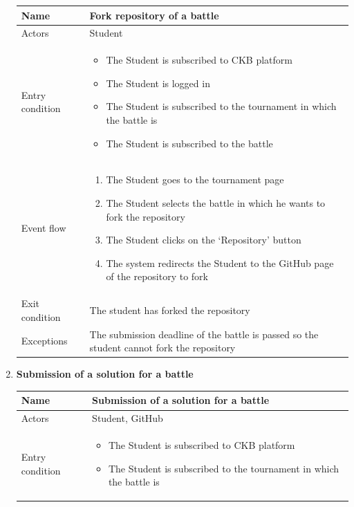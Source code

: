 \begin{enumerate}[label=UC\arabic*:]
    \begin{tabular}{|p{3cm}|p{8cm}|}
        \hline
        Name & Fork repository of a battle \\
        \hline
        Actors & Student \\
        \hline
        Entry condition &
        \begin{itemize}
            \item The Student is subscribed to CKB platform
            \item The Student is logged in
            \item The Student is subscribed to the tournament in which the battle is
            \item The Student is subscribed to the battle
        \end{itemize} \\
        \hline
        Event flow &
        \begin{enumerate}[label=\arabic*.]
            \item The Student goes to the tournament page
            \item The Student selects the battle in which he wants to fork the repository
            \item The Student clicks on the `Repository' button
            \item The system redirects the Student to the GitHub page of the repository to fork
        \end{enumerate} \\
        \hline
        Exit condition & The student has forked the repository \\
        \hline
        Exceptions & The submission deadline of the battle is passed so the student cannot fork the repository \\
        \hline
    \end{tabular}
    \item \textbf{Submission of a solution for a battle} \\
    \begin{tabular}{|p{3cm}|p{8cm}|}
        \hline
        Name & Submission of a solution for a battle \\
        \hline
        Actors & Student, GitHub \\
        \hline
        Entry condition &
        \begin{itemize}
            \item The Student is subscribed to CKB platform
            \item The Student is subscribed to the tournament in which the battle is

\end{itemize}
\end{tabular}
\end{enumerate}

